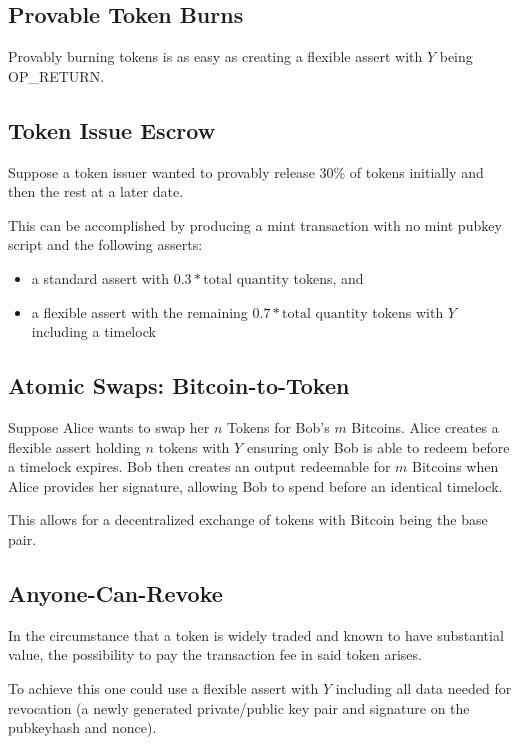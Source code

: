 \documentclass[9pt,oneside]{amsart}
\begin{document}
\subsection{Provable Token Burns}
Provably burning tokens is as easy as creating a flexible assert with $Y$ being OP\_RETURN.
\subsection{Token Issue Escrow}
Suppose a token issuer wanted to provably release 30\% of tokens initially and then the rest at a later date.

This can be accomplished by producing a mint transaction with no mint pubkey script and the following asserts:
\begin{itemize}
    \item a standard assert with $0.3*\text{total quantity}$ tokens, and
    \item a flexible assert with the remaining $0.7*\text{total quantity}$ tokens with $Y$ including a timelock
\end{itemize}

\subsection{Atomic Swaps: Bitcoin-to-Token}
Suppose Alice wants to swap her $n$ Tokens for Bob's $m$ Bitcoins. Alice creates a flexible assert holding $n$ tokens with $Y$ ensuring only Bob is able to redeem before a timelock expires. Bob then creates an output redeemable for $m$ Bitcoins when Alice provides her signature, allowing Bob to spend before an identical timelock.

This allows for a decentralized exchange of tokens with Bitcoin being the base pair.

\subsection{Anyone-Can-Revoke}
In the circumstance that a token is widely traded and known to have substantial value, the possibility to pay the transaction fee in said token arises.

To achieve this one could use a flexible assert with $Y$ including all data needed for revocation (a newly generated private/public key pair and signature on the pubkeyhash and nonce).
\end{document}
